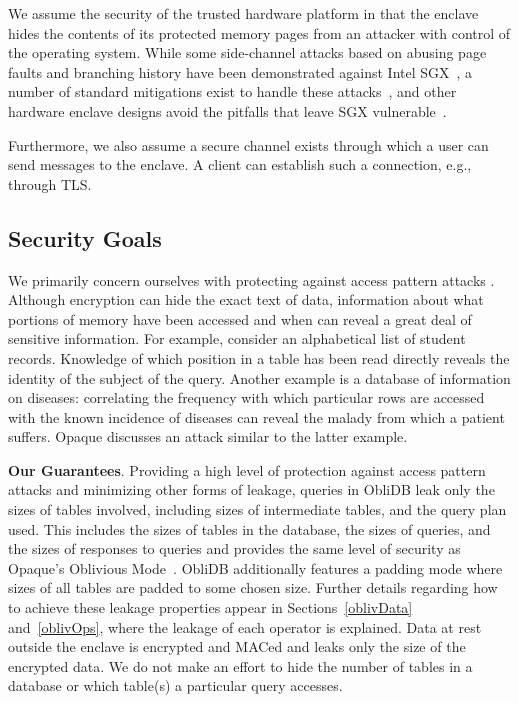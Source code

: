 \documentclass[letterpaper,twocolumn,10pt]{article}
\newcommand{\ignore}[1]{}
\def\name/{ObliDB}
\begin{document}
We assume the security of the trusted hardware platform in that the enclave hides the contents of its protected memory pages from an attacker with control of the operating system. While some side-channel attacks based on abusing page faults and branching history have been demonstrated against Intel SGX~\cite{LSG+16,XCP15}, a number of standard mitigations exist to handle these attacks~\cite{SCNS16,RLT15,SLK+17,SLKP17}, and other hardware enclave designs avoid the pitfalls that leave SGX vulnerable~\cite{CLD16, LHM+15, MLS+13}.

Furthermore, we also assume a secure channel exists through which a user can send messages to the enclave. A client can establish such a connection, e.g., through TLS. \ignore{ (this is fairly straightforward with SGX), but we did not implement this for our tests, as it is not directly related to the functionality provided by \name/.}

\subsection{Security Goals}
We primarily concern ourselves with protecting against access pattern attacks \cite{IKK12}. Although encryption can hide the exact text of data, information about what portions of memory have been accessed and when can reveal a great deal of sensitive information. For example, consider an alphabetical list of student records. Knowledge of which position in a table has been read directly reveals the identity of the subject of the query. Another example is a database of information on diseases: correlating the frequency with which particular rows are accessed with the known incidence of diseases can reveal the malady from which a patient suffers. Opaque \cite{ZDB+17} discusses an attack similar to the latter example.

\noindent \textbf{Our Guarantees}. Providing a high level of protection against access pattern attacks and minimizing other forms of leakage, queries in \name/ leak only the sizes of tables involved, including sizes of intermediate tables, and the query plan used. This includes the sizes of tables in the database, the sizes of queries, and the sizes of responses to queries and provides the same level of security as Opaque's Oblivious Mode~\cite{ZDB+17}. \name/ additionally features a padding mode where sizes of all tables are padded to some chosen size. Further details regarding how to achieve these leakage properties appear in Sections~\ref{oblivData} and~\ref{oblivOps}, where the leakage of each operator is explained. Data at rest outside the enclave is encrypted and MACed and leaks only the size of the encrypted data. We do not make an effort to hide the number of tables in a database or which table(s) a particular query accesses.
\end{document}
